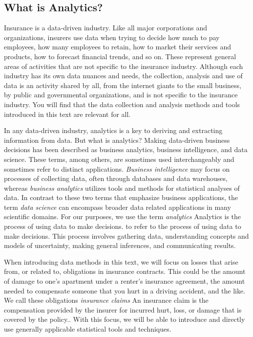 \documentclass[]{book}
\theoremstyle{definition}
\theoremstyle{definition}
\theoremstyle{definition}
\theoremstyle{remark}
\begin{document}
\subsection{What is Analytics?}\label{what-is-analytics}

Insurance is a data-driven industry. Like all major corporations and
organizations, insurers use data when trying to decide how much to pay
employees, how many employees to retain, how to market their services
and products, how to forecast financial trends, and so on. These
represent general areas of activities that are not specific to the
insurance industry. Although each industry has its own data nuances and
needs, the collection, analysis and use of data is an activity shared by
all, from the internet giants to the small business, by public and
governmental organizations, and is not specific to the insurance
industry. You will find that the data collection and analysis methods
and tools introduced in this text are relevant for all.

In any data-driven industry, analytics is a key to deriving and
extracting information from data. But what is analytics? Making
data-driven business decisions has been described as business analytics,
business intelligence, and data science. These terms, among others, are
sometimes used interchangeably and sometimes refer to distinct
applications. \emph{Business intelligence} may focus on processes of
collecting data, often through databases and data warehouses, whereas
\emph{business analytics} utilizes tools and methods for statistical
analyses of data. In contrast to these two terms that emphasize business
applications, the term \emph{data science} can encompass broader data
related applications in many scientific domains. For our purposes, we
use the term \emph{analytics}{ Analytics is the process of using data to
make decisions.} to refer to the process of using data to make
decisions. This process involves gathering data, understanding concepts
and models of uncertainty, making general inferences, and communicating
results.

When introducing data methods in this text, we will focus on losses that
arise from, or related to, obligations in insurance contracts. This
could be the amount of damage to one's apartment under a renter's
insurance agreement, the amount needed to compensate someone that you
hurt in a driving accident, and the like. We call these obligations
\emph{insurance claims}{ An insurance claim is the compensation provided
by the insurer for incurred hurt, loss, or damage that is covered by the
policy.}. With this focus, we will be able to introduce and directly use
generally applicable statistical tools and techniques.
\end{document}
